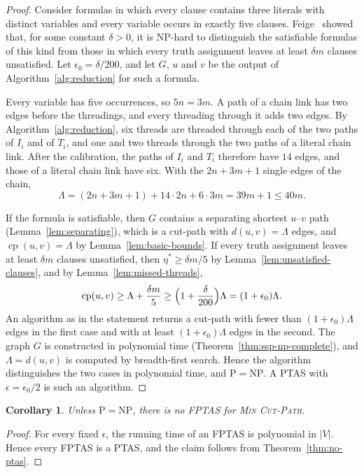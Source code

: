 \documentclass[a4paper,fleqn]{cas-sc}
\numberwithin{equation}{section}
\theoremstyle{definition}
\theoremstyle{plain}
\newtheorem{corollary}[definition]{Corollary}
\theoremstyle{remark}
\newcommand{\cp}{\operatorname{cp}}                  %
\newcommand{\MinCutPath}{\textsc{Min Cut-Path}}
\begin{document}
\begin{proof}
Consider formulas in which every clause contains three literals with distinct variables and every variable occurs in exactly five clauses.
Feige~\cite[Proposition~2.1.2]{Feige1998Threshold} showed that, for some constant $\delta > 0$, it is NP-hard to distinguish the satisfiable formulas of this kind from those in which every truth assignment leaves at least $\delta m$ clauses unsatisfied.
Let $\epsilon_0 = \delta/200$, and let $G$, $u$ and $v$ be the output of Algorithm~\ref{alg:reduction} for such a formula.

Every variable has five occurrences, so $5n = 3m$.
A path of a chain link has two edges before the threadings, and every threading through it adds two edges.
By Algorithm~\ref{alg:reduction}, six threads are threaded through each of the two paths of $I_i$ and of $T_i$, and one and two threads through the two paths of a literal chain link.
After the calibration, the paths of $I_i$ and $T_i$ therefore have $14$ edges, and those of a literal chain link have six.
With the $2n + 3m + 1$ single edges of the chain,
\[
\Lambda = (2n + 3m + 1) + 14 \cdot 2n + 6 \cdot 3m = 39m + 1 \leq 40m.
\]

If the formula is satisfiable, then $G$ contains a separating shortest $u$--$v$ path (Lemma~\ref{lem:separating}), which is a cut-path with $d(u,v) = \Lambda$ edges, and $\cp(u,v) = \Lambda$ by Lemma~\ref{lem:basic-bounds}.
If every truth assignment leaves at least $\delta m$ clauses unsatisfied, then $\eta^{*} \geq \delta m / 5$ by Lemma~\ref{lem:unsatisfied-clauses}, and by Lemma~\ref{lem:missed-threads},
\[
\cp(u,v) \geq \Lambda + \frac{\delta m}{5} \geq \Bigl(1 + \frac{\delta}{200}\Bigr)\Lambda = (1+\epsilon_0)\Lambda.
\]
An algorithm as in the statement returns a cut-path with fewer than $(1+\epsilon_0)\Lambda$ edges in the first case and with at least $(1+\epsilon_0)\Lambda$ edges in the second.
The graph $G$ is constructed in polynomial time (Theorem~\ref{thm:ssp-np-complete}), and $\Lambda = d(u,v)$ is computed by breadth-first search.
Hence the algorithm distinguishes the two cases in polynomial time, and $\mathrm{P} = \mathrm{NP}$.
A PTAS with $\epsilon = \epsilon_0/2$ is such an algorithm.
\end{proof}

\begin{corollary}
\label{cor:no-fptas}
Unless $\mathrm{P} = \mathrm{NP}$, there is no FPTAS for \MinCutPath.
\end{corollary}

\begin{proof}
For every fixed $\epsilon$, the running time of an FPTAS is polynomial in $|V|$.
Hence every FPTAS is a PTAS, and the claim follows from Theorem~\ref{thm:no-ptas}.
\end{proof}
\end{document}
